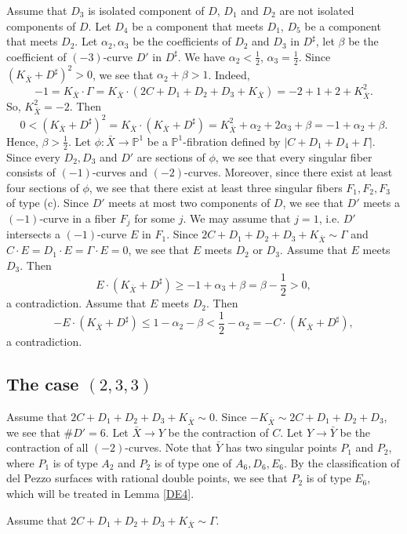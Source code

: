 \documentclass[10pt,oneside,reqno]{amsart}
\newcommand{\pp}{\mathbb{P}}
\theoremstyle{definition}
\theoremstyle{remark}
\numberwithin{equation}{section}
\begin{document}
Assume that $D_3$ is isolated component of $D$, $D_1$ and $D_2$ are not isolated components of $D$. Let $D_4$ be a component that meets $D_1$, $D_5$ be a component that meets $D_2$. Let $\alpha_2, \alpha_3$ be the coefficients of $D_2$ and $D_3$ in $D^{\sharp}$, let $\beta$ be the coefficient of $(-3)$-curve $D'$ in $D^{\sharp}$. We have $\alpha_2<\frac{1}{2}$, $\alpha_3=\frac{1}{2}$. Since $(K_{\bar{X}}+D^{\sharp})^2>0$, we see that $\alpha_2+\beta>1$.  Indeed, $$-1=K_{\bar{X}}\cdot\Gamma=K_{\bar{X}}\cdot(2C+D_1+D_2+D_3+K_{\bar{X}})=-2+1+2+K_{\bar{X}}^2.$$ So, $K_{\bar{X}}^2=-2$. Then $$0<(K_{\bar{X}}+D^{\sharp})^2=K_{\bar{X}}\cdot(K_{\bar{X}}+D^{\sharp})=K_{\bar{X}}^2+\alpha_2+2\alpha_3+\beta=-1+\alpha_2+\beta.$$ Hence, $\beta>\frac{1}{2}$. Let $\phi\colon\bar{X}\rightarrow\pp^1$ be a $\pp^1$-fibration defined by $|C+D_1+D_4+\Gamma|$. Since every $D_2, D_3$ and $D'$ are sections of $\phi$, we see that every singular fiber consists of $(-1)$-curves and $(-2)$-curves. Moreover, since there exist at least four sections of $\phi$, we see that there exist at least three singular fibers $F_1, F_2, F_3$ of type (c). Since $D'$ meets at most two components of $D$, we see that $D'$ meets a $(-1)$-curve in a fiber $F_j$ for some $j$. We may assume that $j=1$, i.e. $D'$ intersects a $(-1)$-curve $E$ in $F_1$. Since $2C+D_1+D_2+D_3+K_{\bar{X}}\sim \Gamma$  and $C\cdot E=D_1\cdot E=\Gamma\cdot E=0$, we see that $E$ meets $D_2$ or $D_3$.
Assume that $E$ meets $D_3$. Then
\[E\cdot(K_{\bar{X}}+D^{\sharp})\geq-1+\alpha_3+\beta=\beta-\frac{1}{2}> 0,\] a contradiction. Assume that $E$ meets $D_2$. Then \[-E\cdot(K_{\bar{X}}+D^{\sharp})\leq 1-\alpha_2-\beta<\frac{1}{2}-\alpha_2=-C\cdot(K_{\bar{X}}+D^{\sharp}),\]
a contradiction.


\subsection{The case $(2,3,3)$} Assume that $2C+D_1+D_2+D_3+K_{\bar{X}}\sim 0$. Since $-K_{\bar{X}}\sim 2C+D_1+D_2+D_3$, we see that $\# D'=6$. Let $\bar{X}\rightarrow Y$ be the contraction of $C$. Let $Y\rightarrow\bar{Y}$ be the contraction of all $(-2)$-curves. Note that $\bar{Y}$ has two singular points $P_1$ and $P_2$, where $P_1$ is of type $A_2$ and $P_2$ is of type one of $A_6, D_6, E_6$. By the classification of del Pezzo surfaces with rational double points, we see  that $P_2$ is of type $E_6$, which will be treated in Lemma \ref{DE4}.

Assume that $2C+D_1+D_2+D_3+K_{\bar{X}}\sim \Gamma$.
\end{document}
